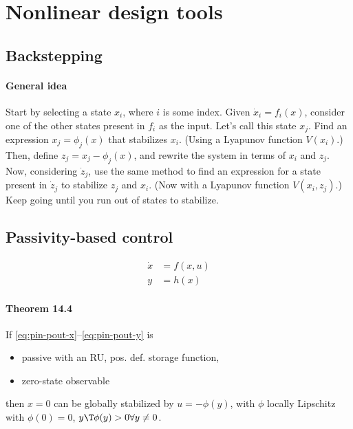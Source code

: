 \section{Nonlinear design tools}

\subsection{Backstepping}
\paragraph{General idea}
Start by selecting a state $x_i$, where $i$ is some index. Given $\dot{x}_i = f_i(x)$, consider one of the other states present in $f_i$ as the input. Let's call this state $x_j$. Find an expression $x_j = \phi_j(x)$ that stabilizes $x_i$. (Using a Lyapunov function $V(x_i)$.) Then, define $z_j = x_j - \phi_j(x)$, and rewrite the system in terms of $x_i$ and $z_j$. Now, considering $\dot{z}_j$, use the same method to find an expression for a state present in $\dot{z}_j$ to stabilize $z_j$ and $x_i$. (Now with a Lyapunov function $V(x_i, z_j)$.) Keep going until you run out of states to stabilize.

\subsection{Passivity-based control}
\begin{align}
	\dot{x} &= f(x,u) \label{eq:pin-pout-x} \\
	y       &= h(x)   \label{eq:pin-pout-y}
\end{align}

\paragraph{Theorem 14.4}
If \eqref{eq:pin-pout-x}--\eqref{eq:pin-pout-y} is
\begin{itemize}
	\item passive with an RU, pos. def. storage function,
	\item zero-state observable
\end{itemize}
then $x = 0$ can be globally stabilized by $u = -\phi(y)$, with $\phi$ locally Lipschitz with $\phi(0) = 0$, $y\T \phi(y) > 0 \forall y \neq 0$.
